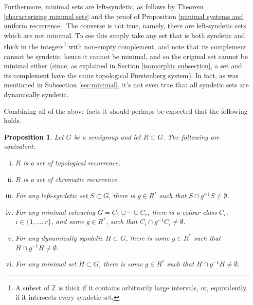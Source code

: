 \documentclass{amsart}
\numberwithin{equation}{section}
\newtheorem{proposition}[lemma]{Proposition}
\theoremstyle{definition}
\theoremstyle{plain}
\newcommand{\Z}{{\mathbb Z}}
\begin{document}
Furthermore, minimal sets are left-syndetic, as follows by Theorem 
\ref{characterizing minimal sets} and the proof of Proposition \ref{minimal systems and uniform recurrence}. The converse is not true, namely, there are 
left-syndetic sets which are not minimal. To see this simply take any set 
that is both syndetic and thick in the integers\footnote{A subset of $\Z$ is thick if it contains arbitrarily large intervals, or, equivalently, if it intersects every syndetic set.} with non-empty 
complement, and note that its complement cannot be syndetic, hence it cannot 
be minimal, and so the original set cannot be minimal either (since, 
as explained in Section \ref{isomorphic subsection}, a set and its complement have 
the same topological Furstenberg system).  
In fact, as was mentioned in Subsection \ref{sec:minimal}, it's not even true that all syndetic sets are dynamically syndetic. 

Combining all of the above facts it should perhaps be expected that the 
following holds.  

\begin{proposition}
Let $G$ be a semigroup and let $R\subset G$. The following are equivalent:
\begin{enumerate}[(i)]
    \item $R$ is a set of topological recurrence. 
    \item $R$ is a set of chromatic recurrence.
    \item For any left-syndetic set $S\subset G$, there is $g\in R^{*}$ such that $S\cap g^{-1}S \neq \emptyset$.
    \item For any \textit{minimal} colouring $G=C_1\cup \cdots \cup C_r$, there is a colour class $C_i$, $i\in \{1,\ldots,r\}$, and some $g\in R^{*}$, such that $C_i \cap g^{-1}C_i \neq \emptyset$.
    \item For any dynamically syndetic $H\subset G$,  there is some $g\in R^{*}$ such that $H\cap g^{-1}H \neq \emptyset$.
    \item For any minimal set $H\subset G$, there is some $g\in R^{*}$ such that $H\cap g^{-1}H \neq \emptyset$.
\end{enumerate}
\end{proposition}
\end{document}
